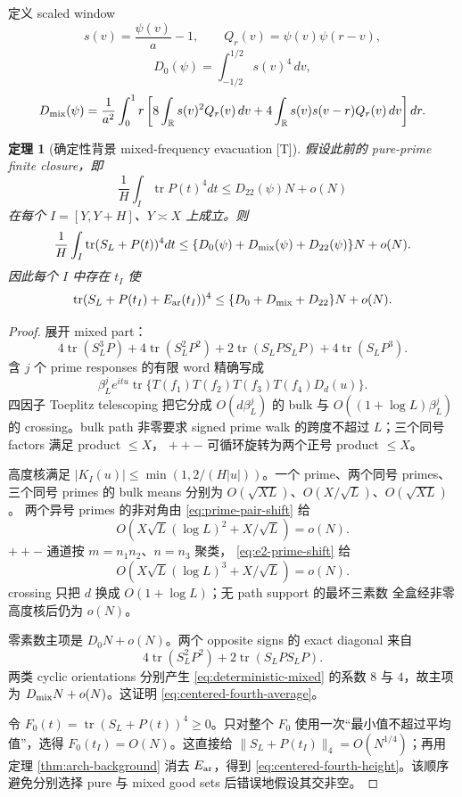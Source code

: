 \documentclass[UTF8,11pt,a4paper]{ctexart}
\newtheorem{theorem}{定理}[section]
\theoremstyle{definition}
\theoremstyle{remark}
\begin{document}
定义 scaled window
\[
 s(v)=\frac{\psi(v)}a-1,\qquad
 Q_r(v)=\psi(v)\psi(r-v),
\]
\[
 D_0(\psi)=\int_{-1/2}^{1/2}s(v)^4\,dv,
\]
\[
 D_{\rm mix}(\psi)
 =\frac1{a^2}\int_0^1r
 \left[
 8\int_{\mathbb R}s(v)^2Q_r(v)\,dv
 +4\int_{\mathbb R}s(v)s(v-r)Q_r(v)\,dv
 \right]dr.
 \label{eq:deterministic-mixed}
\]

\begin{theorem}[确定性背景 mixed-frequency evacuation {[T]}]
\label{thm:mixed-closure}
假设此前的 pure-prime finite closure，即
\[
 \frac1H\int_I\operatorname{tr}P(t)^4dt
 \le D_{22}(\psi)N+o(N)
\]
在每个 $I=[Y,Y+H]$、$Y\asymp X$ 上成立。则
\[
 \frac1H\int_I\operatorname{tr}(S_L+P(t))^4dt
 \le
 \{D_0(\psi)+D_{\rm mix}(\psi)+D_{22}(\psi)\}N+o(N).
 \label{eq:centered-fourth-average}
\]
因此每个 $I$ 中存在 $t_I$ 使
\[
 \operatorname{tr}(S_L+P(t_I)+E_{\rm ar}(t_I))^4
 \le
 \{D_0+D_{\rm mix}+D_{22}\}N+o(N).
 \label{eq:centered-fourth-height}
\]
\end{theorem}

\begin{proof}
展开 mixed part：
\[
 4\operatorname{tr}(S_L^3P)
 +4\operatorname{tr}(S_L^2P^2)
 +2\operatorname{tr}(S_LPS_LP)
 +4\operatorname{tr}(S_LP^3).
\]
含 $j$ 个 prime responses 的有限 word 精确写成
\[
 \beta_L^je^{itu}
 \operatorname{tr}\{T(f_1)T(f_2)T(f_3)T(f_4)D_d(u)\}.
\]
四因子 Toeplitz telescoping 把它分成
$O(d\beta_L^j)$ 的 bulk 与
$O((1+\log L)\beta_L^j)$ 的 crossing。bulk path 非零要求 signed
prime walk 的跨度不超过 $L$；三个同号 factors 满足 product $\le X$，
$++-$ 可循环旋转为两个正号 product $\le X$。

高度核满足 $|K_I(u)|\le\min(1,2/(H|u|))$。一个 prime、两个同号
primes、三个同号 primes 的 bulk means 分别为
$O(\sqrt{XL})$、$O(X/\sqrt L)$、$O(\sqrt{XL})$。
两个异号 primes 的非对角由 \eqref{eq:prime-pair-shift} 给
\[
 O\left(X\sqrt L(\log L)^2+X/\sqrt L\right)=o(N).
\]
$++-$ 通道按 $m=n_1n_2$、$n=n_3$ 聚类，
\eqref{eq:e2-prime-shift} 给
\[
 O\left(X\sqrt L(\log L)^3+X/\sqrt L\right)=o(N).
\]
crossing 只把 $d$ 换成 $O(1+\log L)$；无 path support 的最坏三素数
全盒经非零高度核后仍为 $o(N)$。

零素数主项是 $D_0N+o(N)$。两个 opposite signs 的 exact diagonal 来自
\[
 4\operatorname{tr}(S_L^2P^2)
 +2\operatorname{tr}(S_LPS_LP).
\]
两类 cyclic orientations 分别产生 \eqref{eq:deterministic-mixed} 的系数
$8$ 与 $4$，故主项为 $D_{\rm mix}N+o(N)$。这证明
\eqref{eq:centered-fourth-average}。

令 $F_0(t)=\operatorname{tr}(S_L+P(t))^4\ge0$。只对整个 $F_0$
使用一次“最小值不超过平均值”，选得 $F_0(t_I)=O(N)$。这直接给
$\|S_L+P(t_I)\|_4=O(N^{1/4})$；再用定理
\ref{thm:arch-background} 消去 $E_{\rm ar}$，得到
\eqref{eq:centered-fourth-height}。该顺序避免分别选择 pure 与 mixed
good sets 后错误地假设其交非空。
\end{proof}
\end{document}
